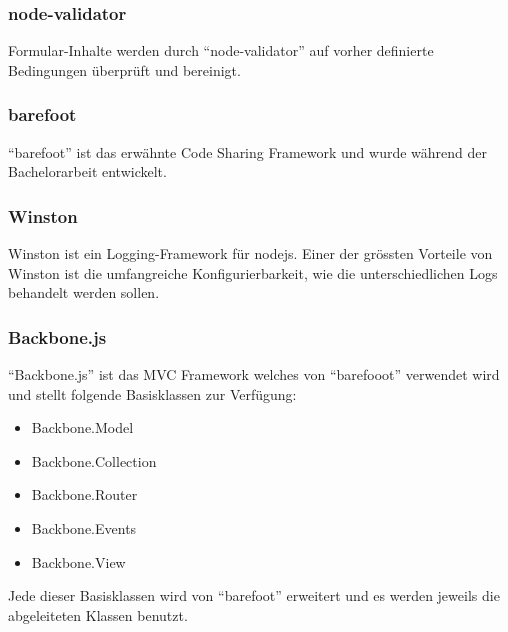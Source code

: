 \subsubsection*{node-validator}
Formular-Inhalte werden durch ``node-validator'' \cite{nodevalidator} auf vorher definierte Bedingungen überprüft und bereinigt.

\subsubsection*{barefoot}
``barefoot'' \cite{Barefoot} ist das erwähnte Code Sharing Framework und wurde während der Bachelorarbeit entwickelt.

\subsubsection*{Winston}
Winston \cite{Winston} ist ein Logging-Framework für \gls{nodejs}. Einer der grössten Vorteile von Winston ist die umfangreiche Konfigurierbarkeit, wie die unterschiedlichen Logs behandelt werden sollen.

\subsubsection*{Backbone.js}
``Backbone.js'' \cite{Backbonejs} ist das MVC Framework welches von ``barefooot'' verwendet wird und stellt folgende Basisklassen zur Verfügung:
\begin{itemize}
	\item Backbone.Model
	\item Backbone.Collection
	\item Backbone.Router
	\item Backbone.Events
	\item Backbone.View
\end{itemize}

Jede dieser Basisklassen wird von ``barefoot'' erweitert und es werden jeweils die abgeleiteten Klassen benutzt.